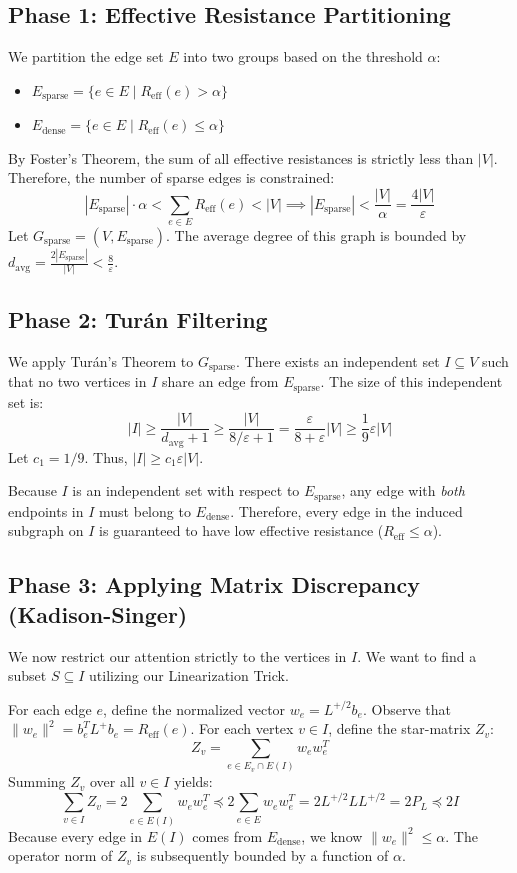 \documentclass[12pt]{article}
\begin{document}
\subsection{Phase 1: Effective Resistance Partitioning}
We partition the edge set $E$ into two groups based on the threshold $\alpha$:
\begin{itemize}
    \item $E_{\text{sparse}} = \{e \in E \mid R_{\text{eff}}(e) > \alpha\}$
    \item $E_{\text{dense}} = \{e \in E \mid R_{\text{eff}}(e) \le \alpha\}$
\end{itemize}

By Foster's Theorem, the sum of all effective resistances is strictly less than $|V|$. Therefore, the number of sparse edges is constrained:
\[
|E_{\text{sparse}}| \cdot \alpha < \sum_{e \in E} R_{\text{eff}}(e) < |V| \implies |E_{\text{sparse}}| < \frac{|V|}{\alpha} = \frac{4|V|}{\varepsilon}
\]
Let $G_{\text{sparse}} = (V, E_{\text{sparse}})$. The average degree of this graph is bounded by $d_{\text{avg}} = \frac{2|E_{\text{sparse}}|}{|V|} < \frac{8}{\varepsilon}$.

\subsection{Phase 2: Tur\'an Filtering}
We apply Tur\'an's Theorem to $G_{\text{sparse}}$. There exists an independent set $I \subseteq V$ such that no two vertices in $I$ share an edge from $E_{\text{sparse}}$. The size of this independent set is:
\[
|I| \ge \frac{|V|}{d_{\text{avg}} + 1} \ge \frac{|V|}{8/\varepsilon + 1} = \frac{\varepsilon}{8 + \varepsilon} |V| \ge \frac{1}{9} \varepsilon |V|
\]
Let $c_1 = 1/9$. Thus, $|I| \ge c_1 \varepsilon |V|$. 

Because $I$ is an independent set with respect to $E_{\text{sparse}}$, any edge with \emph{both} endpoints in $I$ must belong to $E_{\text{dense}}$. Therefore, every edge in the induced subgraph on $I$ is guaranteed to have low effective resistance ($R_{\text{eff}} \le \alpha$).

\subsection{Phase 3: Applying Matrix Discrepancy (Kadison-Singer)}
We now restrict our attention strictly to the vertices in $I$. We want to find a subset $S \subseteq I$ utilizing our Linearization Trick.

For each edge $e$, define the normalized vector $w_e = L^{+/2} b_e$. Observe that $\|w_e\|^2 = b_e^T L^+ b_e = R_{\text{eff}}(e)$. 
For each vertex $v \in I$, define the star-matrix $Z_v$:
\[
Z_v = \sum_{e \in E_v \cap E(I)} w_e w_e^T
\]
Summing $Z_v$ over all $v \in I$ yields:
\[
\sum_{v \in I} Z_v = 2 \sum_{e \in E(I)} w_e w_e^T \preceq 2 \sum_{e \in E} w_e w_e^T = 2 L^{+/2} L L^{+/2} = 2 P_L \preceq 2I
\]
Because every edge in $E(I)$ comes from $E_{\text{dense}}$, we know $\|w_e\|^2 \le \alpha$. The operator norm of $Z_v$ is subsequently bounded by a function of $\alpha$. 
\end{document}
